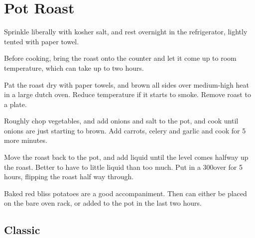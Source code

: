 \section{Pot Roast}
\begin{recipe}



Sprinkle liberally with kosher salt, and rest overnight in the refrigerator, lightly tented with paper towel.

Before cooking, bring the roast onto the counter and let it come up to room temperature, which can take up to two hours.

Pat the roast dry with paper towels, and brown all sides over medium-high heat in a large dutch oven. Reduce temperature if it starts to smoke. Remove roast to a plate.


Roughly chop vegetables, and add onions and salt to the pot, and cook until onions are just starting to brown. Add carrots, celery and garlic and cook for 5 more minutes.

Move the roast back to the pot, and add liquid until the level comes halfway up the roast. Better to have to little liquid than too much. Put in a 300\degree over for 5 hours, flipping the roast half way through.

Baked red bliss potatoes are a good accompaniment. Then can either be placed on the bare oven rack, or added to the pot in the last two hours.

\subsection{Classic}




\end{recipe}
